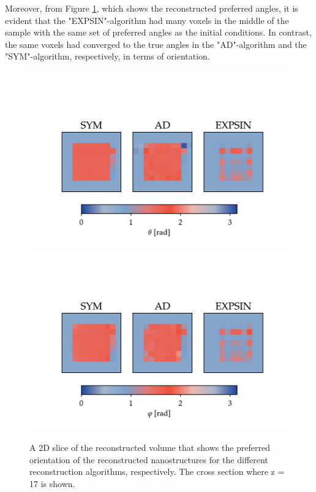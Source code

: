 \clearpage

Moreover, from Figure \ref{fig:phantom_reconstruction_2D_angles}, which shows the reconstructed preferred angles,
it is evident that the "EXPSIN"-algorithm had many voxels in the middle of the sample with the same set of preferred angles as the initial conditions.
In contrast, the same voxels had converged to the true angles in the "AD"-algorithm and the "SYM"-algorithm, respectively,
in terms of orientation.


\begin{figure}[h!]
    \centering
    \includegraphics[trim = {0 0 0 2.5cm}, clip, width = 1\textwidth]{./svg-inkscape/P_slices_theta_svg-tex.pdf}
    \includegraphics[trim = {0 0 0 2.5cm}, clip, width = 1\textwidth]{./svg-inkscape/P_slices_phi_svg-tex.pdf}
    \caption[Slice of Reconstructed Orientation for Phantom Data Set]{ A 2D slice of the reconstructed volume that shows the preferred orientation of the reconstructed nanostructures for the different reconstruction algorithms, respectively.
        The cross section where z = 17 is shown.}
    \label{fig:phantom_reconstruction_2D_angles}
\end{figure}




